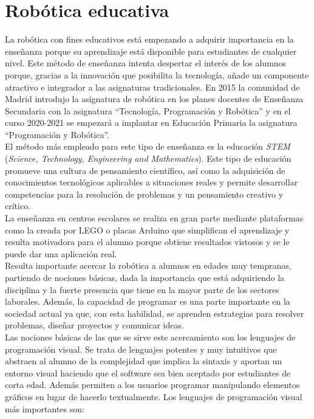 \section{Robótica educativa}
\label{sec:educativa}
La robótica con fines educativos está empezando a adquirir importancia en la enseñanza porque su aprendizaje está disponible para estudiantes de cualquier nivel. Este método de enseñanza intenta despertar el interés de los alumnos porque, gracias a la innovación que posibilita la tecnología, añade un componente atractivo e integrador a las asignaturas tradicionales. En 2015 la comunidad de Madrid introdujo la asignatura de robótica en los planes docentes de Enseñanza Secundaria con la asignatura ``Tecnología, Programación y Robótica''\cite{bib:secundaria} y en el curso 2020-2021 se empezará a implantar en Educación Primaria la asignatura ``Programación y Robótica''\cite{bib:primaria}.\\

El método más empleado para este tipo de enseñanza es la educación \textit{STEM} (\textit{Science, Technology, Engineering and Mathematics}). Este tipo de educación promueve una cultura de pensamiento científico, así como la adquisición de conocimientos tecnológicos aplicables a situaciones reales y permite desarrollar competencias para la resolución de problemas y un pensamiento creativo y crítico.   \\


La enseñanza en centros escolares se realiza en gran parte mediante plataformas como la creada por LEGO o placas Arduino que simplifican el aprendizaje y resulta motivadora para el alumno porque obtiene resultados vistosos y se le puede dar una aplicación real. \\

Resulta importante acercar la robótica a alumnos en edades muy tempranas, partiendo de nociones básicas, dada la importancia que está adquiriendo la disciplina y la fuerte presencia que tiene en la mayor parte de los sectores laborales. Además, la capacidad de programar es una parte importante en la sociedad actual ya que, con esta habilidad, se aprenden estrategias para resolver problemas, diseñar proyectos y comunicar ideas. \\


Las nociones básicas de las que se sirve este acercamiento son los lenguajes de programación visual. Se trata de lenguajes potentes y muy intuitivos que abstraen al alumno de la complejidad que implica la sintaxis y aportan un entorno visual haciendo que el software sea bien aceptado por estudiantes de corta edad. Además permiten a los usuarios programar manipulando elementos gráficos en lugar de hacerlo textualmente. Los lenguajes de programación visual más importantes son: 

